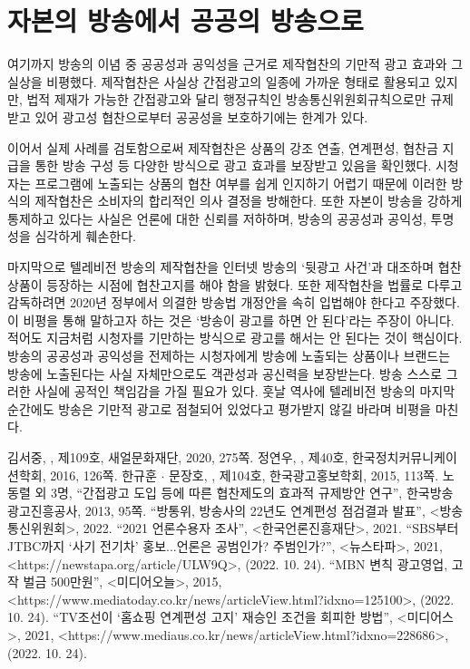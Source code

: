 \section*{자본의 방송에서 공공의 방송으로}

여기까지 방송의 이념 중 공공성과 공익성을 근거로 제작협찬의 기만적 광고 효과와 그 실상을 비평했다. 제작협찬은 사실상 간접광고의 일종에 가까운 형태로 활용되고 있지만, 법적 제재가 가능한 간접광고와 달리 행정규칙인 방송통신위원회규칙으로만 규제받고 있어 광고성 협찬으로부터 공공성을 보호하기에는 한계가 있다.

이어서 실제 사례를 검토함으로써 제작협찬은 상품의 강조 연출, 연계편성, 협찬금 지급을 통한 방송 구성 등 다양한 방식으로 광고 효과를 보장받고 있음을 확인했다. 시청자는 프로그램에 노출되는 상품의 협찬 여부를 쉽게 인지하기 어렵기 때문에 이러한 방식의 제작협찬은 소비자의 합리적인 의사 결정을 방해한다. 또한 자본이 방송을 강하게 통제하고 있다는 사실은 언론에 대한 신뢰를 저하하며, 방송의 공공성과 공익성, 투명성을 심각하게 훼손한다.

마지막으로 텔레비전 방송의 제작협찬을 인터넷 방송의 `뒷광고 사건'과 대조하며 협찬 상품이 등장하는 시점에 협찬고지를 해야 함을 밝혔다. 또한 제작협찬을 법률로 다루고 감독하려면 2020년 정부에서 의결한 방송법 개정안을 속히 입법해야 한다고 주장했다. 이 비평을 통해 말하고자 하는 것은 `방송이 광고를 하면 안 된다'라는 주장이 아니다. 적어도 지금처럼 시청자를 기만하는 방식으로 광고를 해서는 안 된다는 것이 핵심이다. 방송의 공공성과 공익성을 전제하는 시청자에게 방송에 노출되는 상품이나 브랜드는 방송에 노출된다는 사실 자체만으로도 객관성과 공신력을 보장받는다. 방송 스스로 그러한 사실에 공적인 책임감을 가질 필요가 있다. 훗날 역사에 텔레비전 방송의 마지막 순간에도 방송은 기만적 광고로 점철되어 있었다고 평가받지 않길 바라며 비평을 마친다.

\begin{thebibliography}{9}
   김서중, ,  제109호, 새얼문화재단, 2020, 275쪽.
   정연우, ,  제40호, 한국정치커뮤니케이션학회, 2016, 126쪽.
   한규훈 $\cdot$ 문장호, ,  제104호, 한국광고홍보학회, 2015, 113쪽.
   노동렬 외 3명, ``간접광고 도입 등에 따른 협찬제도의 효과적 규제방안 연구'', 한국방송광고진흥공사, 2013, 95쪽.
   ``방통위, 방송사의 \textquotesingle22년도 연계편성 점검결과 발표'', <방송통신위원회>, 2022.
   ``2021 언론수용자 조사'', <한국언론진흥재단>, 2021.
   ``SBS부터 JTBC까지 `사기 전기차' 홍보...언론은 공범인가? 주범인가?'', <뉴스타파>, 2021, <https://newstapa.org/article/ULW9Q>, (2022. 10. 24).
   ``MBN 변칙 광고영업, 고작 벌금 500만원'', <미디어오늘>, 2015, <https://www.mediatoday.co.kr/news/articleView.html?idxno=125100>, (2022. 10. 24).
   ``TV조선이 `홈쇼핑 연계편성 고지' 재승인 조건을 회피한 방법'', <미디어스>, 2021, <https://www.mediaus.co.kr/news/articleView.html?idxno=228686>, (2022. 10. 24).
\end{thebibliography}
